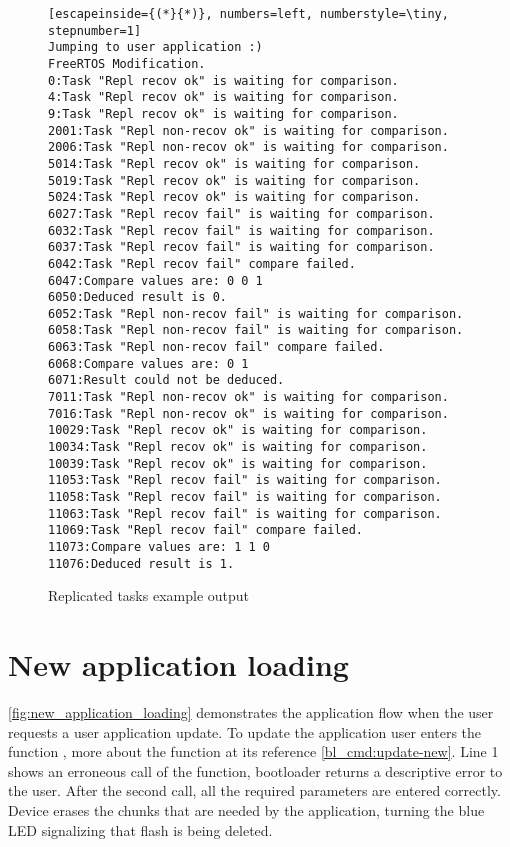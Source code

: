 \begin{figure}[H]
\begin{changemargin}{1cm}{1cm}
\begin{lstlisting}[escapeinside={(*}{*)}, numbers=left, numberstyle=\tiny, stepnumber=1]
Jumping to user application :)
FreeRTOS Modification.
0:Task "Repl recov ok" is waiting for comparison.
4:Task "Repl recov ok" is waiting for comparison.
9:Task "Repl recov ok" is waiting for comparison.
2001:Task "Repl non-recov ok" is waiting for comparison.
2006:Task "Repl non-recov ok" is waiting for comparison.
5014:Task "Repl recov ok" is waiting for comparison.
5019:Task "Repl recov ok" is waiting for comparison.
5024:Task "Repl recov ok" is waiting for comparison.
6027:Task "Repl recov fail" is waiting for comparison.
6032:Task "Repl recov fail" is waiting for comparison.
6037:Task "Repl recov fail" is waiting for comparison.
6042:Task "Repl recov fail" compare failed.
6047:Compare values are: 0 0 1 
6050:Deduced result is 0.
6052:Task "Repl non-recov fail" is waiting for comparison.
6058:Task "Repl non-recov fail" is waiting for comparison.
6063:Task "Repl non-recov fail" compare failed.
6068:Compare values are: 0 1 
6071:Result could not be deduced.
7011:Task "Repl non-recov ok" is waiting for comparison.
7016:Task "Repl non-recov ok" is waiting for comparison.
10029:Task "Repl recov ok" is waiting for comparison.
10034:Task "Repl recov ok" is waiting for comparison.
10039:Task "Repl recov ok" is waiting for comparison.
11053:Task "Repl recov fail" is waiting for comparison.
11058:Task "Repl recov fail" is waiting for comparison.
11063:Task "Repl recov fail" is waiting for comparison.
11069:Task "Repl recov fail" compare failed.
11073:Compare values are: 1 1 0 
11076:Deduced result is 1.
\end{lstlisting}  
\end{changemargin}
\caption{Replicated tasks example output}
\label{fig:replicated_tasks_example_print}
\end{figure}

\section{New application loading}

\autoref{fig:new_application_loading} demonstrates the application flow when the user requests a user application update. To update the application user enters the function , more about the function at its reference \autoref{bl_cmd:update-new}. Line 1 shows an erroneous call of the function, bootloader returns a descriptive error to the user. After the second call, all the required parameters are entered correctly. Device erases the chunks that are needed by the application, turning the blue LED signalizing that flash is being deleted.

